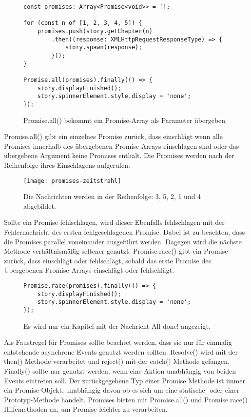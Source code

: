 \begin{figure}[H]
\begin{lstlisting}
const promises: Array<Promise<void>> = [];

for (const n of [1, 2, 3, 4, 5]) {
    promises.push(story.getChapter(n)
        .then((response: XMLHttpRequestResponseType) => {
            story.spawn(response);
        }));
}

Promise.all(promises).finally(() => {
    story.displayFinished();
    story.spinnerElement.style.display = 'none';
});
\end{lstlisting}
\caption{Promise.all() bekommt ein Promise-Array als Parameter übergeben}
\end{figure}

\noindent
Promise.all() gibt ein einzelnes Promise zurück, dass einschlägt wenn alle Promises innerhalb des übergebenen Promise-Arrays einschlagen sind oder das übergebene Argument keine Promises enthält. Die Promises werden nach der Reihenfolge ihres Einschlagens aufgerufen.

\begin{figure}[H]
\centering
\texttt{[image: promises-zeitstrahl]}
\caption{Die Nachrichten werden in der Reihenfolge: 3, 5, 2, 1 und 4 abgebildet.}
\end{figure}

\noindent
Sollte ein Promise fehlschlagen, wird dieser Ebenfalls fehlschlagen mit der Fehlernachricht des ersten fehlgeschlagenen Promise.\cite{promise-executor} Dabei ist zu beachten, dass die Promises parallel voneinander ausgeführt werden. Dagegen wird die nächste Methode verhältnismäßig seltener genutzt. Promise.race() gibt ein Promise zurück, dass einschlägt oder fehlschlägt, sobald das erste Promise des Übergebenen Promise-Arrays einschlägt oder fehlschlägt.\cite{versprechen}

\begin{figure}[H]
\begin{lstlisting}
Promise.race(promises).finally(() => {
    story.displayFinished();
    story.spinnerElement.style.display = 'none';
});
\end{lstlisting}
\caption{Es wird nur ein Kapitel mit der Nachricht \glqq All done!\grqq{} angezeigt.}
\end{figure}

 \noindent
 Als Faustregel für Promises sollte beachtet werden, dass sie nur für einmalig entstehende asynchrone Events genutzt werden sollten. Resolve() wird mit der then() Methode verarbeitet und reject() mit der catch() Methode gefangen. Finally() sollte nur genutzt werden, wenn eine Aktion unabhängig von beiden Events eintreten soll. Der zurückgegebene Typ einer Promise Methode ist immer ein Promise-Objekt, unabhängig davon ob es sich um eine statische- oder einer Prototyp-Methode handelt. Promises bieten mit Promise.all() und Promise.race() Hilfemethoden an, um Promise leichter zu verarbeiten.

